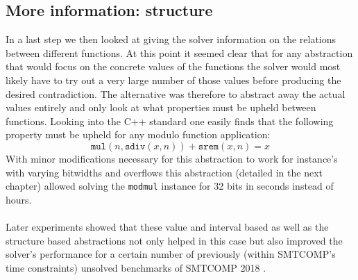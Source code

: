 \subsection{More information: structure}
In a last step we then looked at giving the solver information on the relations between different functions. At this point it seemed clear that for any abstraction that would focus on the concrete values of the functions the solver would most likely have to try out a very large number of those values before producing the desired contradiction. The alternative was therefore to abstract away the actual values entirely and only look at what properties must be upheld between functions. Looking into the C++ standard \cite{ISO14882:2011} one easily finds that the following property must be upheld for any modulo function application:
\[
    \texttt{mul}\left( n, \texttt{sdiv}\left(x,n\right) \right) + \texttt{srem}\left(x,n\right) = x
\]
With minor modifications necessary for this abstraction to work for instance's with varying bitwidths and overflows this abstraction (detailed in the next chapter) allowed solving the \texttt{modmul} instance for 32 bits in seconds instead of hours.

\paragraph{}
Later experiments showed that these value and interval based as well as the structure based abstractions not only helped in this case but also improved the solver's performance for a certain number of previously (within SMTCOMP's time constraints) unsolved benchmarks of SMTCOMP 2018 \cite{SMTCOMP18}.